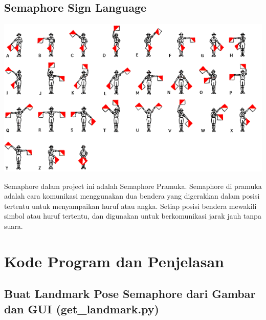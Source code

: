 \documentclass[a4paper,12pt]{article}
\begin{document}
\subsection{Semaphore Sign Language}
\begin{center}
    \includegraphics[width=1.0\textwidth]{semaphore.png}
    \vspace{1em}
\end{center}
Semaphore dalam project ini adalah Semaphore Pramuka. Semaphore di pramuka adalah cara komunikasi menggunakan dua bendera yang digerakkan dalam posisi tertentu untuk menyampaikan huruf atau angka. Setiap posisi bendera mewakili simbol atau huruf tertentu, dan digunakan untuk berkomunikasi jarak jauh tanpa suara.

\section{Kode Program dan Penjelasan}
\subsection{Buat Landmark Pose Semaphore dari Gambar dan GUI (get\_landmark.py)}
\end{document}
